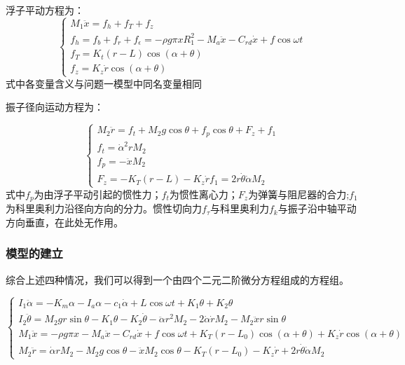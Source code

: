 \documentclass[12pt,utf8]{article}
\begin{document}
浮子平动方程为：
\begin{equation}
	\begin{cases}
		M_1\ddot{x} = f_h +f_T+f_z\\
		f_h = f_b + f_r + f_\epsilon = -\rho g\pi xR_1^2-M_a\ddot{x}-C_{rd}\dot{x}+f\cos\omega t\\
		f_T = K_t(r-L)\cos(\alpha+\theta) \\
		f_z = K_z\dot{r}\cos(\alpha+\theta)
		
	\end{cases}
\end{equation}
式中各变量含义与问题一模型中同名变量相同

振子径向运动方程为：

\begin{equation}
	\begin{cases}
		M_2\ddot{r} = f_t +M_2g\cos\theta+f_p\cos\theta+F_z+f_1\\
		f_t = \dot{\alpha}^2 r M_2 \\
		f_p = -\ddot{x}M_2 \\
		F_z = -K_T(r-L)-K_z\dot{r}
		f_1=2r\dot{\theta}\dot{\alpha}M_2
	\end{cases}
\end{equation}
式中$f_p$为由浮子平动引起的惯性力；$f_t$为惯性离心力；$F_z$为弹簧与阻尼器的合力;$f_1$为科里奥利力沿径向方向的分力。惯性切向力$f_\tau$与科里奥利力$f_k$与振子沿中轴平动方向垂直，在此处无作用。

\subsubsection{模型的建立}

综合上述四种情况，我们可以得到一个由四个二元二阶微分方程组成的方程组。

\begin{equation}
	\begin{cases}
		I_1\ddot{\alpha} = -K_m\alpha-I_a\alpha-c_1\dot{\alpha} + L\cos\omega t + K_1\theta + K_2\theta \\
		I_2\ddot{\theta}  = M_2gr\sin\theta-K_1\theta-K_2\dot{\theta}-\ddot{\alpha}r^2M_2-2\dot{\alpha}\dot{r}M_2-M_2\ddot{x}r\sin\theta \\
		M_1\ddot{x} = -\rho g\pi x-M_a\ddot{x}-C_{rd}\dot{x}+f\cos\omega t+K_T(r-L_0)\cos(\alpha+\theta) + K_z\dot{r}\cos(\alpha+\theta) \\
		M_2\ddot{r} = \dot{\alpha}rM_2-M_2g\cos\theta - \ddot{x}M_2\cos\theta - K_T(r-L_0)-K_z\dot{r}+2r\dot{\theta}\dot{\alpha}M_2
	\end{cases}
\end{equation}
\end{document}
